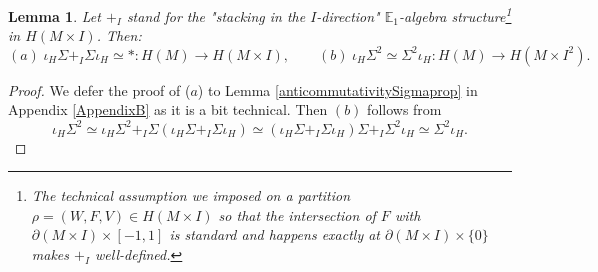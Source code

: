 \documentclass[a4paper, oneside]{amsart}
\newcommand{\1}{\mathds{1}}
\newtheorem{lem}[thm]{Lemma}
\theoremstyle{remark}
\theoremstyle{definition}
\numberwithin{equation}{section}
\begin{document}
\begin{lem}\label{suspensionequivariancelem}
    Let $+_I$ stand for the "stacking in the $I$-direction" $\mathbb{E}_1$-algebra structure\footnote{The technical assumption we imposed on a partition $\rho=(W,F,V)\in H(M\times I)$ so that the intersection of $F$ with $\partial(M\times I)\times [-1,1]$ is standard and happens exactly at $\partial(M\times I)\times \{0\}$ makes $+_I$ well-defined.} in $H(M\times I)$. Then:
   $$
(a)\hspace{3pt} \iota_H\Sigma+_I\Sigma\iota_H\simeq*: H(M)\to H(M\times I), \qquad (b)\hspace{3pt} \iota_H\Sigma^2\simeq\Sigma^2\iota_H: H(M)\to H(M\times I^2).
   $$
\end{lem}

\begin{proof}
    We defer the proof of ($a$) to Lemma \ref{anticommutativitySigmaprop} in Appendix \ref{AppendixB} as it is a bit technical. Then $(b)$ follows from
    $$
\iota_H\Sigma^2\simeq \iota_H\Sigma^2+_I\Sigma(\iota_H\Sigma+_I\Sigma\iota_H)\simeq (\iota_H\Sigma+_I\Sigma\iota_H)\Sigma+_I\Sigma^2\iota_H\simeq\Sigma^2\iota_H.
    $$
    \end{proof}
\end{document}
